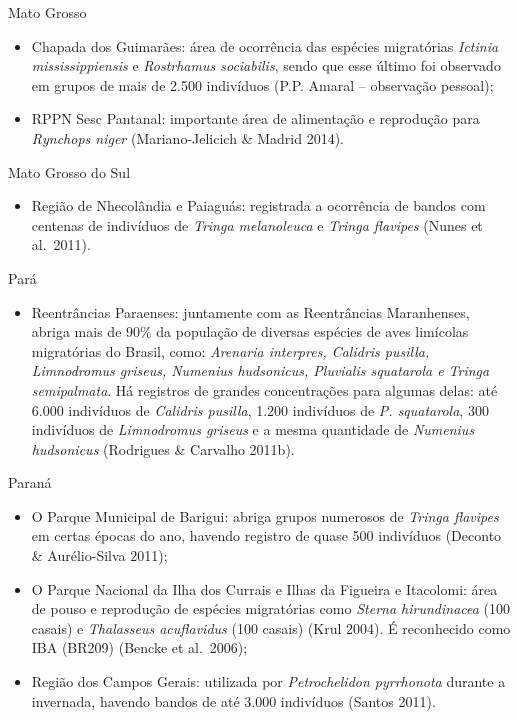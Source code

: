 \documentclass[
  oneside]{scrbook}
\providecommand{\tightlist}{%
  \setlength{\itemsep}{0pt}\setlength{\parskip}{0pt}}
\begin{document}
Mato Grosso

\begin{itemize}
\item
  Chapada dos Guimarães: área de ocorrência das espécies migratórias \emph{Ictinia mississippiensis} e \emph{Rostrhamus sociabilis}, sendo que esse último foi observado em grupos de mais de 2.500 indivíduos (P.P. Amaral -- observação pessoal);
\item
  RPPN Sesc Pantanal: importante área de alimentação e reprodução para \emph{Rynchops niger} (Mariano-Jelicich \& Madrid 2014).
\end{itemize}

Mato Grosso do Sul

\begin{itemize}
\tightlist
\item
  Região de Nhecolândia e Paiaguás: registrada a ocorrência de bandos com centenas de indivíduos de \emph{Tringa melanoleuca} e \emph{Tringa flavipes} (Nunes et al.~2011).
\end{itemize}

Pará

\begin{itemize}
\tightlist
\item
  Reentrâncias Paraenses: juntamente com as Reentrâncias Maranhenses, abriga mais de 90\% da população de diversas espécies de aves limícolas migratórias do Brasil, como: \emph{Arenaria interpres, Calidris pusilla, Limnodromus griseus, Numenius hudsonicus, Pluvialis squatarola e Tringa semipalmata}. Há registros de grandes concentrações para algumas delas: até 6.000 indivíduos de \emph{Calidris pusilla}, 1.200 indivíduos de \emph{P. squatarola}, 300 indivíduos de \emph{Limnodromus griseus} e a mesma quantidade de \emph{Numenius hudsonicus} (Rodrigues \& Carvalho 2011b).
\end{itemize}

Paraná

\begin{itemize}
\item
  O Parque Municipal de Barigui: abriga grupos numerosos de \emph{Tringa flavipes} em certas épocas do ano, havendo registro de quase 500 indivíduos (Deconto \& Aurélio-Silva 2011);
\item
  O Parque Nacional da Ilha dos Currais e Ilhas da Figueira e Itacolomi: área de pouso e reprodução de espécies migratórias como \emph{Sterna hirundinacea} (100 casais) e \emph{Thalasseus acuflavidus} (100 casais) (Krul 2004). É reconhecido como IBA (BR209) (Bencke et al.~2006);
\item
  Região dos Campos Gerais: utilizada por \emph{Petrochelidon pyrrhonota} durante a invernada, havendo bandos de até 3.000 indivíduos (Santos 2011).
\end{itemize}
\end{document}
